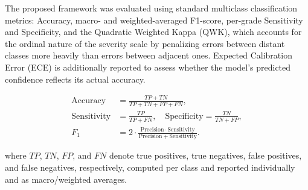 \documentclass[conference]{IEEEtran}
\begin{document}
The proposed framework was evaluated using standard multiclass classification metrics: Accuracy, macro- and weighted-averaged F1-score, per-grade Sensitivity and Specificity, and the Quadratic Weighted Kappa (QWK), which accounts for the ordinal nature of the severity scale by penalizing errors between distant classes more heavily than errors between adjacent ones. Expected Calibration Error (ECE) is additionally reported to assess whether the model's predicted confidence reflects its actual accuracy.

\begin{align}
\mathrm{Accuracy} &= \frac{TP+TN}{TP+TN+FP+FN},\\
\mathrm{Sensitivity} &= \frac{TP}{TP+FN},\quad
\mathrm{Specificity} = \frac{TN}{TN+FP},\\
F_1 &= 2\cdot
\frac{\mathrm{Precision}\cdot\mathrm{Sensitivity}}
{\mathrm{Precision}+\mathrm{Sensitivity}}.
\end{align}

where $TP$, $TN$, $FP$, and $FN$ denote true positives, true negatives, false positives, and false negatives, respectively, computed per class and reported individually and as macro/weighted averages.
\end{document}
